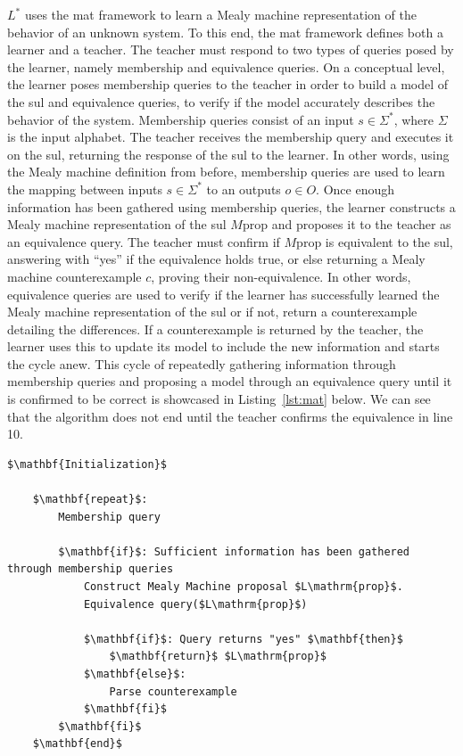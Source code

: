 $L^*$ uses the \ac{mat} framework to learn a Mealy machine representation of the behavior of an unknown system. To this end, the \ac{mat} framework defines both a learner and a teacher. The teacher must respond to two types of queries posed by the learner, namely membership and equivalence queries. On a conceptual level, the learner poses membership queries to the teacher in order to build a model of the \ac{sul} and equivalence queries, to verify if the model accurately describes the behavior of the system. Membership queries consist of an input $s \in \Sigma^*$, where $\Sigma$ is the input alphabet. The teacher receives the membership query and executes it on the \ac{sul}, returning the response of the \ac{sul} to the learner. In other words, using the Mealy machine definition from before, membership queries are used to learn the mapping between inputs $s \in \Sigma^*$ to an outputs $o \in O$. Once enough information has been gathered using membership queries, the learner constructs a Mealy machine representation of the \ac{sul} $M\mathrm{prop}$ and proposes it to the teacher as an equivalence query. The teacher must confirm if $M\mathrm{prop}$ is equivalent to the \ac{sul}, answering with  ``yes'' if the equivalence holds true, or else returning a Mealy machine counterexample $c$, proving their non-equivalence. In other words, equivalence queries are used to verify if the learner has successfully learned the Mealy machine representation of the \ac{sul} or if not, return a counterexample detailing the differences. If a counterexample is returned by the teacher, the learner uses this to update its model to include the new information and starts the cycle anew. This cycle of repeatedly gathering information through membership queries and proposing a model through an equivalence query until it is confirmed to be correct is showcased in Listing~\ref{lst:mat} below. We can see that the algorithm does not end until the teacher confirms the equivalence in line 10.

\begin{lstlisting}[mathescape=true, float=ht, caption=MAT algorithm, label=lst:mat]
	$\mathbf{Initialization}$
	
	$\mathbf{repeat}$:
		Membership query
		
		$\mathbf{if}$: Sufficient information has been gathered through membership queries
			Construct Mealy Machine proposal $L\mathrm{prop}$.
			Equivalence query($L\mathrm{prop}$)
			
			$\mathbf{if}$: Query returns "yes" $\mathbf{then}$
				$\mathbf{return}$ $L\mathrm{prop}$
			$\mathbf{else}$:
				Parse counterexample
			$\mathbf{fi}$
		$\mathbf{fi}$
	$\mathbf{end}$
	
\end{lstlisting}


